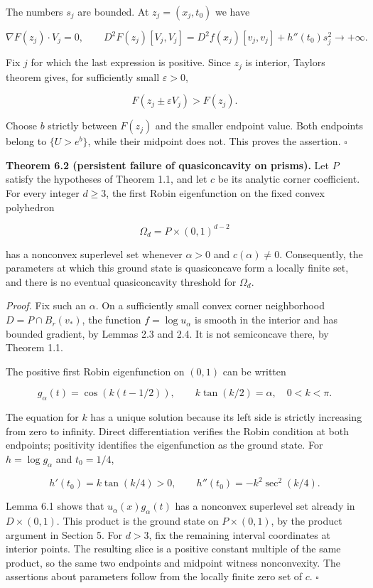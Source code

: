 \documentclass[11pt]{article}
\begin{document}
The numbers \(s_j\) are bounded. At \(z_j=(x_j,t_0)\) we have

\[
\nabla F(z_j)\cdot V_j=0,\qquad
D^2F(z_j)[V_j,V_j]
=D^2f(x_j)[v_j,v_j]+h''(t_0)s_j^2\longrightarrow+\infty.
\tag{6.4}
\]

Fix \(j\) for which the last expression is positive. Since \(z_j\) is
interior, Taylor\textquotesingle s theorem gives, for sufficiently small
\(\varepsilon>0\),

\[
F(z_j\pm\varepsilon V_j)>F(z_j).
\tag{6.5}
\]

Choose \(b\) strictly between \(F(z_j)\) and the smaller endpoint value.
Both endpoints belong to \(\{U>e^b\}\), while their midpoint does not.
This proves the assertion. \(\square\)

\textbf{Theorem 6.2 (persistent failure of quasiconcavity on prisms).}
Let \(P\) satisfy the hypotheses of Theorem 1.1, and let \(c\) be its
analytic corner coefficient. For every integer \(d\ge3\), the first
Robin eigenfunction on the fixed convex polyhedron

\[
\Omega_d=P\times(0,1)^{d-2}
\tag{6.6}
\]

has a nonconvex superlevel set whenever \(\alpha>0\) and
\(c(\alpha)\ne0\). Consequently, the parameters at which this ground
state is quasiconcave form a locally finite set, and there is no
eventual quasiconcavity threshold for \(\Omega_d\).

\emph{Proof.} Fix such an \(\alpha\). On a sufficiently small convex
corner neighborhood \(D=P\cap B_r(v_*)\), the function
\(f=\log u_\alpha\) is smooth in the interior and has bounded gradient,
by Lemmas 2.3 and 2.4. It is not semiconcave there, by Theorem 1.1.

The positive first Robin eigenfunction on \((0,1)\) can be written

\[
g_\alpha(t)=\cos(k(t-1/2)),\qquad
k\tan(k/2)=\alpha,\quad 0<k<\pi.
\tag{6.7}
\]

The equation for \(k\) has a unique solution because its left side is
strictly increasing from zero to infinity. Direct differentiation
verifies the Robin condition at both endpoints; positivity identifies
the eigenfunction as the ground state. For \(h=\log g_\alpha\) and
\(t_0=1/4\),

\[
h'(t_0)=k\tan(k/4)>0,
\qquad h''(t_0)=-k^2\sec^2(k/4).
\tag{6.8}
\]

Lemma 6.1 shows that \(u_\alpha(x)g_\alpha(t)\) has a nonconvex
superlevel set already in \(D\times(0,1)\). This product is the ground
state on \(P\times(0,1)\), by the product argument in Section 5. For
\(d>3\), fix the remaining interval coordinates at interior points. The
resulting slice is a positive constant multiple of the same product, so
the same two endpoints and midpoint witness nonconvexity. The assertions
about parameters follow from the locally finite zero set of \(c\). \(\square\)
\end{document}
